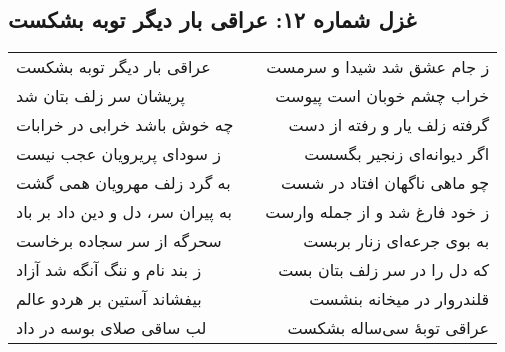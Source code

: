 \begin{center}
\section*{غزل شماره ۱۲: عراقی بار دیگر توبه بشکست}
\label{sec:012}
\begin{longtable}{l p{0.5cm} r}
عراقی بار دیگر توبه بشکست
&&
ز جام عشق شد شیدا و سرمست
\\
پریشان سر زلف بتان شد
&&
خراب چشم خوبان است پیوست
\\
چه خوش باشد خرابی در خرابات
&&
گرفته زلف یار و رفته از دست
\\
ز سودای پریرویان عجب نیست
&&
اگر دیوانه‌ای زنجیر بگسست
\\
به گرد زلف مهرویان همی گشت
&&
چو ماهی ناگهان افتاد در شست
\\
به پیران سر، دل و دین داد بر باد
&&
ز خود فارغ شد و از جمله وارست
\\
سحرگه از سر سجاده برخاست
&&
به بوی جرعه‌ای زنار بربست
\\
ز بند نام و ننگ آنگه شد آزاد
&&
که دل را در سر زلف بتان بست
\\
بیفشاند آستین بر هردو عالم
&&
قلندروار در میخانه بنشست
\\
لب ساقی صلای بوسه در داد
&&
عراقی توبهٔ سی‌ساله بشکست
\\
\end{longtable}
\end{center}
